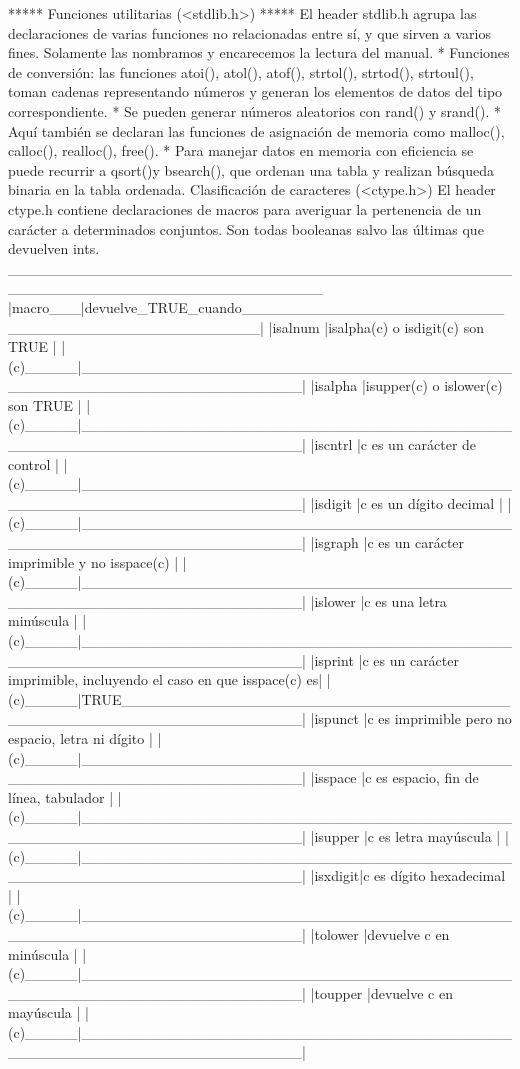 ***** Funciones utilitarias (<stdlib.h>) *****
El header stdlib.h agrupa las declaraciones de varias funciones no relacionadas
entre sí, y que sirven a varios fines. Solamente las nombramos y encarecemos la
lectura del manual.
    * Funciones de conversión: las funciones atoi(), atol(), atof(), strtol(),
      strtod(), strtoul(), toman cadenas representando números y generan los
      elementos de datos del tipo correspondiente.
    * Se pueden generar números aleatorios con rand() y srand().
    * Aquí también se declaran las funciones de asignación de memoria como
      malloc(), calloc(), realloc(), free().
    * Para manejar datos en memoria con eficiencia se puede recurrir a qsort()y
      bsearch(), que ordenan una tabla y realizan búsqueda binaria en la tabla
      ordenada.
Clasificación de caracteres (<ctype.h>)
El header ctype.h contiene declaraciones de macros para averiguar la
pertenencia de un carácter a determinados conjuntos. Son todas booleanas salvo
las últimas que devuelven ints.
 ______________________________________________________________________________
|macro___|devuelve_TRUE_cuando_________________________________________________|
|isalnum |isalpha(c) o isdigit(c) son TRUE                                     |
|(c)_____|_____________________________________________________________________|
|isalpha |isupper(c) o islower(c) son TRUE                                     |
|(c)_____|_____________________________________________________________________|
|iscntrl |c es un carácter de control                                         |
|(c)_____|_____________________________________________________________________|
|isdigit |c es un dígito decimal                                              |
|(c)_____|_____________________________________________________________________|
|isgraph |c es un carácter imprimible y no isspace(c)                         |
|(c)_____|_____________________________________________________________________|
|islower |c es una letra minúscula                                            |
|(c)_____|_____________________________________________________________________|
|isprint |c es un carácter imprimible, incluyendo el caso en que isspace(c) es|
|(c)_____|TRUE_________________________________________________________________|
|ispunct |c es imprimible pero no espacio, letra ni dígito                    |
|(c)_____|_____________________________________________________________________|
|isspace |c es espacio, fin de línea, tabulador                               |
|(c)_____|_____________________________________________________________________|
|isupper |c es letra mayúscula                                                |
|(c)_____|_____________________________________________________________________|
|isxdigit|c es dígito hexadecimal                                             |
|(c)_____|_____________________________________________________________________|
|tolower |devuelve c en minúscula                                             |
|(c)_____|_____________________________________________________________________|
|toupper |devuelve c en mayúscula                                             |
|(c)_____|_____________________________________________________________________|



